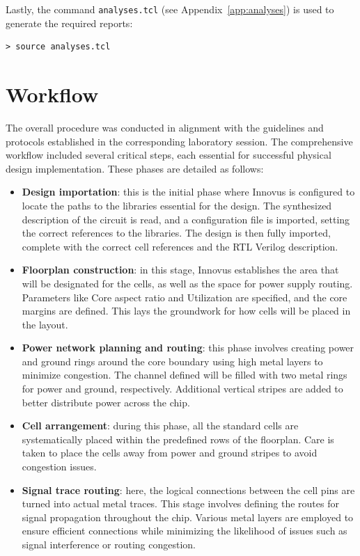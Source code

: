 Lastly, the command \texttt{analyses.tcl} (see Appendix~\ref{app:analyses}) is used to generate the required reports:
\begin{lstlisting}[style=MyShell]
 > source analyses.tcl
\end{lstlisting}

\section{Workflow}
The overall procedure was conducted in alignment with the guidelines and protocols established in the corresponding laboratory session. The comprehensive workflow included several critical steps, each essential for successful physical design implementation. These phases are detailed as follows:

\begin{itemize}
	\item \textbf{Design importation}: this is the initial phase where Innovus is configured to locate the paths to the libraries essential for the design. The synthesized description of the circuit is read, and a configuration file is imported, setting the correct references to the libraries. The design is then fully imported, complete with the correct cell references and the RTL Verilog description.
	
	\item \textbf{Floorplan construction}: in this stage, Innovus establishes the area that will be designated for the cells, as well as the space for power supply routing. Parameters like Core aspect ratio and Utilization are specified, and the core margins are defined. This lays the groundwork for how cells will be placed in the layout.
	
	\item \textbf{Power network planning and routing}: this phase involves creating power and ground rings around the core boundary using high metal layers to minimize congestion. The channel defined will be filled with two metal rings for power and ground, respectively. Additional vertical stripes are added to better distribute power across the chip.
	
	\item \textbf{Cell arrangement}: during this phase, all the standard cells are systematically placed within the predefined rows of the floorplan. Care is taken to place the cells away from power and ground stripes to avoid congestion issues.
	
	\item \textbf{Signal trace routing}: here, the logical connections between the cell pins are turned into actual metal traces. This stage involves defining the routes for signal propagation throughout the chip. Various metal layers are employed to ensure efficient connections while minimizing the likelihood of issues such as signal interference or routing congestion.
	

\end{itemize}
